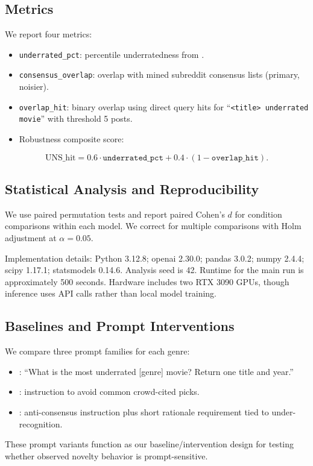 \subsection{Metrics}
We report four metrics:
\begin{itemize}
    \item \texttt{underrated\_pct}: percentile underratedness from \movielens.
    \item \texttt{consensus\_overlap}: overlap with mined subreddit consensus lists (primary, noisier).
    \item \texttt{overlap\_hit}: binary overlap using direct query hits for ``\texttt{<title> underrated movie}'' with threshold 5 posts.
    \item Robustness composite score:
\end{itemize}
\begin{equation}
\text{UNS\_hit} = 0.6\cdot\texttt{underrated\_pct} + 0.4\cdot(1-\texttt{overlap\_hit}).
\end{equation}

\subsection{Statistical Analysis and Reproducibility}
We use paired permutation tests and report paired Cohen's $d$ for condition comparisons within each model. We correct for multiple comparisons with Holm adjustment at $\alpha=0.05$.

Implementation details: Python 3.12.8; openai 2.30.0; pandas 3.0.2; numpy 2.4.4; scipy 1.17.1; statsmodels 0.14.6. Analysis seed is 42. Runtime for the main run is approximately 500 seconds. Hardware includes two RTX 3090 GPUs, though inference uses API calls rather than local model training.

\subsection{Baselines and Prompt Interventions}
We compare three prompt families for each genre:
\begin{itemize}
    \item \baseline: ``What is the most underrated [genre] movie? Return one title and year.''
    \item \anti: instruction to avoid common crowd-cited picks.
    \item \antir: anti-consensus instruction plus short rationale requirement tied to under-recognition.
\end{itemize}
These prompt variants function as our baseline/intervention design for testing whether observed novelty behavior is prompt-sensitive.
